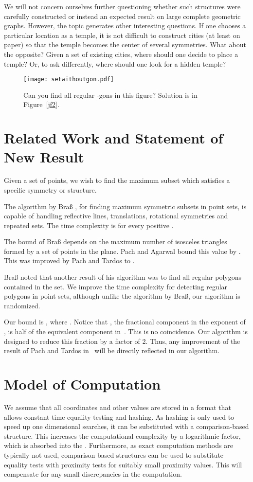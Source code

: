 \documentclass{article}
\begin{document}
We will not concern ourselves further questioning whether such structures were
carefully constructed or instead an expected result on large complete geometric
graphs.  However, the topic generates other interesting questions.
If one chooses a particular location as a temple, it is not 
difficult to construct cities (at least on paper)
so that the temple becomes the center of several symmetries.
What about the opposite?  Given a set of existing cities, where should one decide
to place a temple?  Or, to ask differently, where should one look for a hidden
temple?
\begin{figure}[t!]
\center\texttt{[image: setwithoutgon.pdf]}
\caption{Can you find all regular -gons in this figure? Solution
is in Figure~\ref{jf2}.}
\label{jf1}
\end{figure}

\section{Related Work and Statement of New Result}
\label{previous}

Given a set of  points, we wish to find the maximum subset which satisfies
a specific symmetry or structure.

The algorithm by Bra{\ss} \cite{brass}, for 
finding maximum symmetric subsets in point sets, is capable of
handling reflective lines, translations, rotational symmetries and repeated sets.
The time complexity is  for every positive .


The bound of Bra{\ss} depends on the maximum number of
isosceles triangles formed by a set of points in the plane. Pach and
Agarwal \cite{pachagarwal} bound this value by . 
This was improved by Pach and Tardos
\cite{pach} to .

Bra{\ss} noted that another result of his algorithm
 was to find all regular polygons contained in the set.
We improve the time complexity for detecting regular polygons in point
sets, although unlike the algorithm by Bra{\ss}, our algorithm is randomized.

Our  bound is , where .
Notice that , the fractional component in the exponent of , is half of the equivalent
component in~\cite{brass}. This is no coincidence.
Our algorithm is designed to reduce this fraction by a factor of 2.
Thus, any improvement of the result of Pach and Tardos in~\cite{pach} will be directly
reflected in our algorithm.

\section{Model of Computation}
\label{model}
We assume that all coordinates and other values are stored in a format
that allows constant time equality testing and hashing. As hashing is
only used to speed up one dimensional searches, it can be substituted
with a comparison-based structure. This increases the computational complexity by a 
logarithmic factor, which
is absorbed into the . Furthermore, as exact computation
methods are typically not used, comparison based structures can be
used to substitute equality tests with proximity tests for
suitably small proximity values.  This will compensate for any small discrepancies in
the computation.
\end{document}

